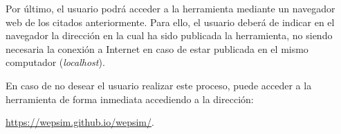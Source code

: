 Por último, el usuario podrá acceder a la herramienta mediante un navegador web de los citados anteriormente. Para ello, el usuario deberá de indicar en el navegador la dirección en la cual ha sido publicada la herramienta, no siendo necesaria la conexión a Internet en caso de estar publicada en el mismo computador (\textit{localhost}).

En caso de no desear el usuario realizar este proceso, puede acceder a la herramienta de forma inmediata accediendo a la dirección: 

\url{https://wepsim.github.io/wepsim/}.